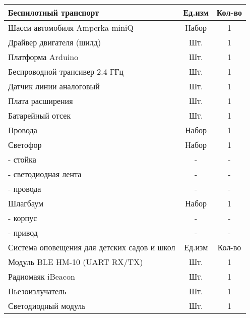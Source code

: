 \begin{longtable}{|p{10cm}|c|c|}   
    \hline
    Беспилотный транспорт & Ед.изм & Кол-во		 \\
    \hline
    Шасси автомобиля Amperka miniQ & Набор & 1 \\
    Драйвер двигателя (шилд) & Шт. & 1 \\
    Платформа Arduino & Шт. & 1 \\
    Беспроводной трансивер 2.4 ГГц & Шт. & 1 \\
    Датчик линии аналоговый & Шт. & 1 \\
    Плата расширения & Шт. & 1 \\
    Батарейный отсек & Шт. & 1 \\
    Провода & Набор & 1	 \\
    Светофор & Набор & 1 \\
    - стойка & - & - \\
    - светодиодная лента & - & - \\
    - провода & - & - \\
    Шлагбаум & Набор & 1 \\
    - корпус & - & - \\
    - привод & - & - \\
    \hline
    \hline
    Система оповещения для детских садов и школ	& Ед.изм & Кол-во		 \\
    \hline
    Модуль BLE HM-10 (UART RX/TX) & Шт. & 1 \\
    Радиомаяк iBeacon & Шт. & 1 \\
    Пьезоизлучатель & Шт. & 1 \\
    Светодиодный модуль & Шт. & 1 \\
    \hline
\end{longtable}